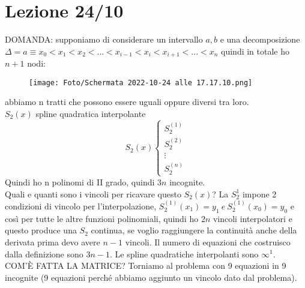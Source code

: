 \documentclass[a4paper, portrait]{book}
\numberwithin{equation}{chapter} %
\begin{document}
\chapter{Lezione 24/10}
DOMANDA: supponiamo di considerare un intervallo $a,b$ e una decomposizione $\Delta ={a \equiv x_0 < x_1 < x_2 < ... < x_{i-1} < x_i < x_{i+1} < ... < x_n}$ quindi in totale ho $n+1$ nodi:
\begin{figure}[h!]
    \centering
    \texttt{[image: Foto/Schermata 2022-10-24 alle 17.17.10.png]}
    \caption{}
\end{figure}
abbiamo n tratti che possono essere uguali oppure diversi tra loro.\\
$S_2(x)$ spline quadratica interpolante
\begin{equation}
    S_2(x) \begin{cases}
        S_2^{(1)}\\
        S_2^{(2)}\\
        \vdots\\
        S_2^{(n)}
    \end{cases}
\end{equation}
Quindi ho n polinomi di II grado, quindi $3n$ incognite.\\
Quali e quanti sono i vincoli per ricavare questo $S_2(x)$? La $S_2^1$ impone 2 condizioni di vincolo per l'interpolazione, $S_2^{(1)} (x_1) = y_1 \ e \ S_2^{(1)} (x_0) = y_0$ e così per tutte le altre funzioni polinomiali, quindi ho $2n$ vincoli interpolatori e questo produce una $S_2$ continua, se voglio raggiungere la continuità anche della derivata prima devo avere $n-1$ vincoli. Il numero di equazioni che costruisco dalla definizione sono $3n-1$. Le spline quadratiche interpolanti sono $\infty^1$.\\
COM'È FATTA LA MATRICE?
Torniamo al problema con 9 equazioni in 9 incognite (9 equazioni perché abbiamo aggiunto un vincolo dato dal problema).
\end{document}
